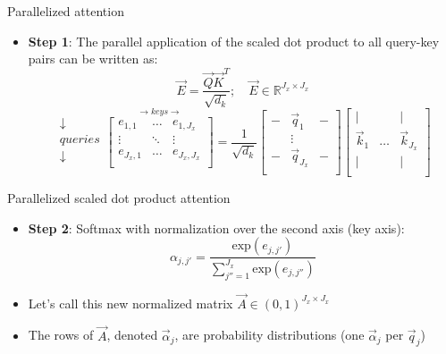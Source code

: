 \begin{vbframe}{Parallelized attention}

\vfill

\begin{itemize}
\item \textbf{Step 1}: The parallel application of the scaled dot product to all query-key pairs can be written as:
$$\vec {E} = \frac{ \vec {Q} \vec {K}^T}{\sqrt{d_k}}; \quad \vec E \in \mathbb{R}^{J_x \times J_x}$$
$$ \begin{matrix} \downarrow \\ queries \\ \downarrow \\ \end{matrix} \overset{\rightarrow keys \rightarrow}{
\begin{bmatrix}
e_{1,1} & \ldots & e_{1,J_x} \\
\vdots & \ddots & \vdots \\
e_{J_x,1} & \ldots & e_{J_x,J_x} \\
\end{bmatrix}} = \frac{1}{\sqrt{d_k}}
\begin{bmatrix} 
- & \vec q_1  & -  \\
& \vdots & \\
-  & \vec q_{J_x}  &  -  \\
\end{bmatrix}  
\begin{bmatrix} 
\lvert &  & \lvert  \\
\vec k_1 & \ldots & \vec k_{J_x} \\
\lvert &  & \lvert  \\
\end{bmatrix}$$
\end{itemize}

\vfill

\end{vbframe}


\begin{vbframe}{Parallelized scaled dot product attention}

\vfill

\begin{itemize}
\item \textbf{Step 2}: Softmax with normalization over the second axis (key axis): 
$$\alpha_{j,j'} = \frac{\mathrm{exp}(e_{j,j'})}{\sum_{j''=1}^{J_x} \mathrm{exp}(e_{j,j''})}$$
\item Let's call this new normalized matrix $\vec A \in (0,1)^{J_x \times J_x}$
\item The rows of $\vec A$, denoted $\vec \alpha_j$, are probability distributions (one $\vec \alpha_j$ per $\vec q_j$)
\end{itemize}

\vfill

\end{vbframe}

